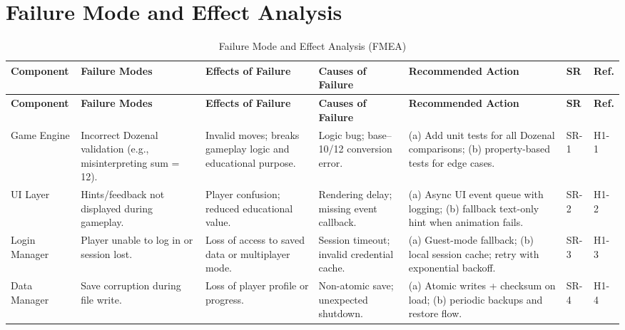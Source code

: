 \documentclass{article}
\begin{document}
\section{Failure Mode and Effect Analysis}
\setlength{\LTleft}{-3cm}
\setlength{\LTright}{0pt}
    \begin{small}
        \begin{longtable}{@{}p{2.6cm} p{3.2cm} p{3.0cm} p{3.0cm} p{6.0cm} p{1.2cm} p{1.2cm}@{}}
            \caption{Failure Mode and Effect Analysis (FMEA)}\label{tab:fmea}\\
            \toprule
            \textbf{Component} & \textbf{Failure Modes} & \textbf{Effects of Failure} &
            \textbf{Causes of Failure} & \textbf{Recommended Action} & \textbf{SR} & \textbf{Ref.}\\
            \midrule
            \endfirsthead
            \toprule
            \textbf{Component} & \textbf{Failure Modes} & \textbf{Effects of Failure} &
            \textbf{Causes of Failure} & \textbf{Recommended Action} & \textbf{SR} & \textbf{Ref.}\\
            \midrule
            \endhead
            \bottomrule
            \endfoot


            Game Engine &
            Incorrect Dozenal validation (e.g., misinterpreting sum = 12). &
            Invalid moves; breaks gameplay logic and educational purpose. &
            Logic bug; base–10/12 conversion error. &
            (a) Add unit tests for all Dozenal comparisons; (b) property-based tests for edge cases. &
            SR-1 & H1-1 \\ \midrule

            UI Layer &
            Hints/feedback not displayed during gameplay. &
            Player confusion; reduced educational value. &
            Rendering delay; missing event callback. &
            (a) Async UI event queue with logging; (b) fallback text-only hint when animation fails. &
            SR-2 & H1-2 \\ \midrule

            Login Manager &
            Player unable to log in or session lost. &
            Loss of access to saved data or multiplayer mode. &
            Session timeout; invalid credential cache. &
            (a) Guest-mode fallback; (b) local session cache; retry with exponential backoff. &
            SR-3 & H1-3 \\ \midrule

            Data Manager &
            Save corruption during file write. &
            Loss of player profile or progress. &
            Non-atomic save; unexpected shutdown. &
            (a) Atomic writes + checksum on load; (b) periodic backups and restore flow. &
            SR-4 & H1-4 \\ \midrule


\end{longtable}
\end{small}
\end{document}
